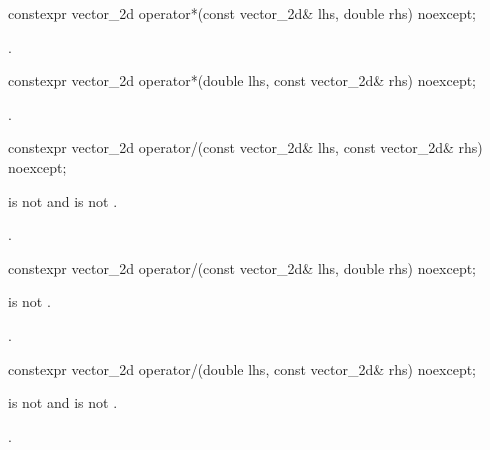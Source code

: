 %
\begin{itemdecl}
constexpr vector_2d operator*(const vector_2d& lhs, double rhs) noexcept;
\end{itemdecl}
\begin{itemdescr}
\pnum
\returns
{}.
\end{itemdescr}

%
\begin{itemdecl}
constexpr vector_2d operator*(double lhs, const vector_2d& rhs) noexcept;
\end{itemdecl}
\begin{itemdescr}
\pnum
\returns
{}.
\end{itemdescr}

%
\begin{itemdecl}
constexpr vector_2d operator/(const vector_2d& lhs, const vector_2d& rhs) 
  noexcept;
\end{itemdecl}
\begin{itemdescr}
\pnum
\requires
{} is not  and  is not .

\pnum
\returns
{}.
\end{itemdescr}

%
\begin{itemdecl}
constexpr vector_2d operator/(const vector_2d& lhs, double rhs) noexcept;
\end{itemdecl}
\begin{itemdescr}
\pnum
\requires
{} is not .

\pnum
\returns
{}.
\end{itemdescr}

%
\begin{itemdecl}
constexpr vector_2d operator/(double lhs, const vector_2d& rhs) noexcept;
\end{itemdecl}
\begin{itemdescr}
\pnum
\requires
{} is not  and  is not .

\pnum
\returns
{}.
\end{itemdescr}
